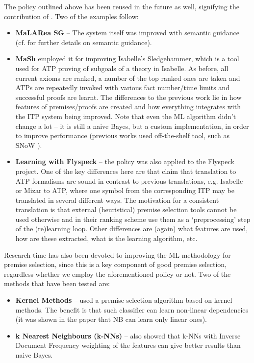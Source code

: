 \documentclass{article}
\begin{document}
The policy outlined above has been reused in the future as well, signifying the
contribution of \cite{MaLARea}. Two of the examples follow:
\begin{itemize}
    \item \textbf{MaLARea SG} \cite{MaLAReaSG} -- The system itself was
        improved with semantic guidance (cf. \cite{SRASS} for further details
        on semantic guidance).
    \item \textbf{MaSh} \cite{MaSh} employed it for improving Isabelle's
        Sledgehammer, which is a tool used for ATP proving of subgoals of
        a theory in Isabelle.  As before, all current axioms are ranked,
        a number of the top ranked ones are taken and ATPs are repeatedly
        invoked with various fact number/time limits and successful proofs are
        learnt. The differences to the previous work lie in how features of
        premises/proofs are created and how everything integrates with the
        ITP system being improved. Note that even the ML algorithm didn't
        change a lot -- it is still a naive Bayes, but a custom
        implementation, in order to improve performance (previous works used
        off-the-shelf tool, such as SNoW \citep{SNoW}).
    \item \textbf{Learning with Flyspeck } -- the policy was also applied to
        the Flyspeck project\citep{FlyspeckProject}. One of the key differences
        here are that \cite{Flyspeck} claim that translation to ATP formalisms
        are sound in contrast to previous translations, e.g. Isabelle or Mizar
        to ATP, where one symbol from the corresponding ITP may be translated
        in several different ways. The motivation for a consistent translation
        is that external (heuristical) premise selection tools cannot be used
        otherwise and in their ranking scheme \cite{Flyspeck} use them as
        a `preprocessing' step of the (re)learning loop. Other differences are
        (again) what features are used, how are these extracted, what is the
        learning algorithm, etc.
\end{itemize}

Research time has also been devoted to improving the ML methodology for
premise selection, since this is a key component of good premise selection,
regardless whether we employ the aforementioned policy or not. Two of the
methods that have been tested are:
\begin{itemize}
    \item \textbf{Kernel Methods} -- 
        \cite{PremiseSelection} used a premise selection algorithm based on
        kernel methods. The benefit is that such classifier can learn
        non-linear dependencies (it was shown in the paper that NB can learn
        only linear ones). 
    \item \textbf{k Nearest Neighbours (k-NNs)} -- \cite{FlyspeckFeatW} also
        showed that k-NNs with Inverse Document Frequency weighting of the
        features can give better results than naive Bayes. 
\end{itemize}
\end{document}

